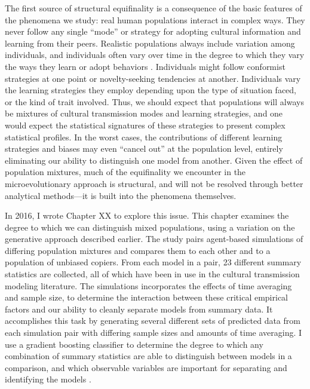 The first source of structural equifinality is a consequence of the basic features of the phenomena we study: real human populations interact in complex ways. They never follow any single ``mode'' or strategy for adopting cultural information and learning from their peers. Realistic populations always include variation among individuals, and individuals often vary over time in the degree to which they vary the ways they learn or adopt behaviors . Individuals might follow conformist strategies at one point or novelty-seeking tendencies at another. Individuals vary the learning strategies they employ depending upon the type of situation faced, or the kind of trait involved. Thus, we should expect that populations will always be mixtures of cultural transmission modes and learning strategies, and one would expect the statistical signatures of these strategies to present complex statistical profiles. In the worst cases, the contributions of different learning strategies and biases may even ``cancel out'' at the population level, entirely eliminating our ability to distinguish one model from another. Given the effect of population mixtures, much of the equifinality we encounter in the microevolutionary approach is structural, and will not be resolved through better analytical methods—it is built into the phenomena themselves. 

In 2016, I wrote Chapter XX to explore this issue. This chapter examines the degree to which we can distinguish mixed populations, using a variation on the generative approach described earlier. The study pairs agent-based simulations of differing population mixtures and compares them to each other and to a population of unbiased copiers. From each model in a pair, 23 different summary statistics are collected, all of which have been in use in the cultural transmission modeling literature. The simulations incorporates the effects of time averaging and sample size, to determine the interaction between these critical empirical factors and our ability to cleanly separate models from summary data. It accomplishes this task by generating several different sets of predicted data from each simulation pair with differing sample sizes and amounts of time averaging. I use a gradient boosting classifier to determine the degree to which any combination of summary statistics are able to distinguish between models in a comparison, and which observable variables are important for separating and identifying the models \citep{AlexeyNatekin2013,Friedman2000,hastie2009elements}.

